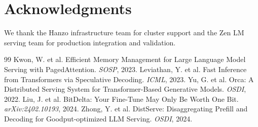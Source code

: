 \documentclass[11pt,a4paper]{article}
\begin{document}
\section*{Acknowledgments}

We thank the Hanzo infrastructure team for cluster support and the Zen LM serving team for production integration and validation.

\begin{thebibliography}{99}
 Kwon, W. et al. Efficient Memory Management for Large Language Model Serving with PagedAttention. \textit{SOSP}, 2023.
 Leviathan, Y. et al. Fast Inference from Transformers via Speculative Decoding. \textit{ICML}, 2023.
 Yu, G. et al. Orca: A Distributed Serving System for Transformer-Based Generative Models. \textit{OSDI}, 2022.
 Liu, J. et al. BitDelta: Your Fine-Tune May Only Be Worth One Bit. \textit{arXiv:2402.10193}, 2024.
 Zhong, Y. et al. DistServe: Disaggregating Prefill and Decoding for Goodput-optimized LLM Serving. \textit{OSDI}, 2024.
\end{thebibliography}
\end{document}
